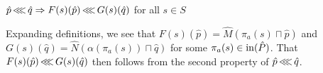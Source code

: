 
\begin{lemma}
$\hat p \operatorname{\lll} \hat q \Rightarrow F(s)(\hat p) \operatorname{\lll} G(s)(\hat q)$ for all $s \in S$
\end{lemma}

Expanding definitions, we see that $F(s)(\hat p) = \hat M(\pi_{a}(s) \sqcap \hat p)$ and $G(s)(\hat q) = \hat N(\alpha(\pi_{a}(s)) \sqcap \hat q)$ for some $\pi_{a}(s) \in \operatorname{in}(\hat P)$. That $F(s)(\hat p) \operatorname{\lll} G(s)(\hat q)$ then follows from the second property of $\hat p \operatorname{\lll} \hat q$.




